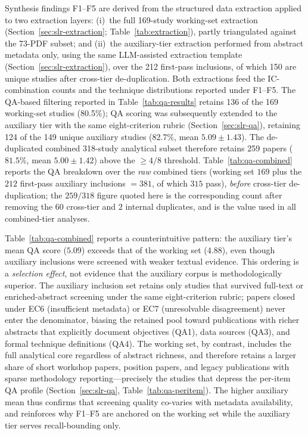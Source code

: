 Synthesis findings F1--F5 are derived from the structured data extraction
applied to two extraction layers: (i)~the full 169-study working-set
extraction (Section~\ref{sec:slr-extraction};
Table~\ref{tab:extraction}), partly triangulated against the 73-PDF subset;
and (ii)~the auxiliary-tier extraction performed from abstract metadata
only, using the same LLM-assisted extraction template
(Section~\ref{sec:slr-extraction}), over the 212 first-pass inclusions, of
which 150 are unique studies after cross-tier de-duplication. Both
extractions feed the IC-combination counts and the technique distributions
reported under F1--F5. The QA-based filtering reported in
Table~\ref{tab:qa-results} retains 136 of the 169 working-set studies
(80.5\%); QA scoring was subsequently extended to the auxiliary tier with
the same eight-criterion rubric (Section~\ref{sec:slr-qa}), retaining 124
of the 149 unique auxiliary
studies (82.7\%, mean $5.09 \pm 1.43$). The de-duplicated combined
318-study analytical subset therefore retains 259 papers
($81.5\%$, mean $5.00 \pm 1.42$) above the $\geq 4/8$ threshold.
Table~\ref{tab:qa-combined} reports the QA breakdown over the
\emph{raw} combined tiers (working set $169$ plus the $212$ first-pass
auxiliary inclusions $= 381$, of which $315$ pass), \emph{before} cross-tier
de-duplication; the $259/318$ figure quoted here is the corresponding count
after removing the $60$ cross-tier and $2$ internal duplicates, and is the
value used in all combined-tier analyses.



Table~\ref{tab:qa-combined} reports a counterintuitive pattern: the auxiliary
tier's mean QA score ($5.09$) exceeds that of the working set ($4.88$),
even though auxiliary inclusions were screened with weaker textual evidence.
This ordering is a \emph{selection effect}, not evidence that the auxiliary
corpus is methodologically superior. The auxiliary inclusion set retains only
studies that survived full-text or enriched-abstract screening under the same
eight-criterion rubric; papers closed under EC6 (insufficient metadata) or
EC7 (unresolvable disagreement) never enter the denominator, biasing the
retained pool toward publications with richer abstracts that explicitly
document objectives (QA1), data sources (QA3), and formal technique
definitions (QA4). The working set, by contrast, includes the full analytical
core regardless of abstract richness, and therefore retains a larger share of
short workshop papers, position papers, and legacy publications with sparse
methodology reporting---precisely the studies that depress the per-item QA
profile (Section~\ref{sec:slr-qa}, Table~\ref{tab:qa-peritem}). The higher
auxiliary mean thus confirms that screening quality co-varies with metadata
availability, and reinforces why F1--F5 are anchored on the working set while
the auxiliary tier serves recall-bounding only.

